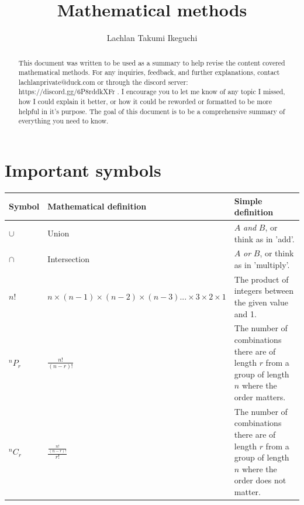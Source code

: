 \documentclass[a4paper,10pt]{report}
\title{Mathematical methods}
\author{Lachlan Takumi Ikeguchi}
\begin{document}
\maketitle
\tableofcontents

\begin{abstract}
	This document was written to be used as a summary to help revise the content covered mathematical methods.  For any inquiries, feedback, and further explanations, contact lachlanprivate@duck.com or through the discord server: https://discord.gg/6P8rddkXFr .  I encourage you to let me know of any topic I missed, how I could explain it better, or how it could be reworded or formatted to be more helpful in it's purpose.  The goal of this document is to be a comprehensive summary of everything you need to know.
\end{abstract}

\section{Important symbols}
\begin{center}
	\begin{tabular}{l|lp{6cm}}
		Symbol  & Mathematical definition                                                  & Simple definition                                                                                              \\ \hline
		$\cup$  & Union                                                                    & $A$ \emph{and} $B$, or think as in 'add'.                                                                      \\
		$\cap$  & Intersection                                                             & $A$ \emph{or} $B$, or think as in 'multiply'.                                                                  \\
		$n!$    & $n \times (n-1) \times (n-2) \times (n-3)... \times 3 \times 2 \times 1$ & The product of integers between the given value and 1.                                                         \\
		$^nP_r$ & $\frac{n!}{(n-r)!}$                                                      & The number of combinations there are of length $r$ from a group of length $n$ where the order matters.         \\
		$^nC_r$ & $\frac{\frac{n!}{(n-r)!}}{r!}$                                           & The number of combinations there are of length $r$ from a group of length $n$ where the order does not matter. \\
	\end{tabular}
\end{center}
\end{document}
